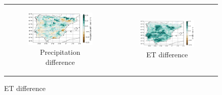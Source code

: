 \begin{figure}[htbp]
\begin{tabular}{cc}
        \begin{subfigure}[b]{0.5\textwidth}
            \caption{Precipitation difference}
            \includegraphics[width=\textwidth]{images/chap4/future/diffmap_precip_futirr.png}
        \end{subfigure} &
        \begin{subfigure}[b]{0.5\textwidth}
            \caption{ET difference}
            \includegraphics[width=\textwidth]{images/chap4/future/diffmap_evap_futirr.png}
        \end{subfigure} \\


\end{tabular}
\end{figure}
